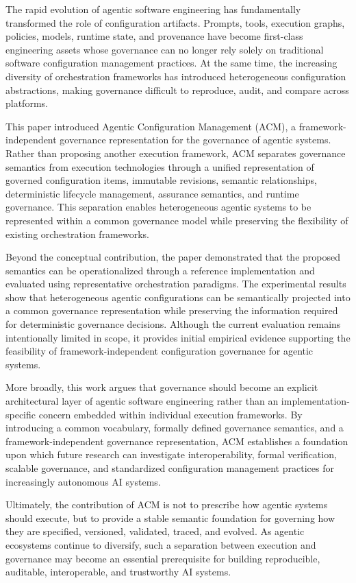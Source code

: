 \documentclass[10pt]{article}
\begin{document}
The rapid evolution of agentic software engineering has fundamentally transformed the role of configuration artifacts. Prompts, tools, execution graphs, policies, models, runtime state, and provenance have become first-class engineering assets whose governance can no longer rely solely on traditional software configuration management practices. At the same time, the increasing diversity of orchestration frameworks has introduced heterogeneous configuration abstractions, making governance difficult to reproduce, audit, and compare across platforms.

This paper introduced Agentic Configuration Management (ACM), a framework-independent governance representation for the governance of agentic systems. Rather than proposing another execution framework, ACM separates governance semantics from execution technologies through a unified representation of governed configuration items, immutable revisions, semantic relationships, deterministic lifecycle management, assurance semantics, and runtime governance. This separation enables heterogeneous agentic systems to be represented within a common governance model while preserving the flexibility of existing orchestration frameworks.

Beyond the conceptual contribution, the paper demonstrated that the proposed semantics can be operationalized through a reference implementation and evaluated using representative orchestration paradigms. The experimental results show that heterogeneous agentic configurations can be semantically projected into a common governance representation while preserving the information required for deterministic governance decisions. Although the current evaluation remains intentionally limited in scope, it provides initial empirical evidence supporting the feasibility of framework-independent configuration governance for agentic systems.

More broadly, this work argues that governance should become an explicit architectural layer of agentic software engineering rather than an implementation-specific concern embedded within individual execution frameworks. By introducing a common vocabulary, formally defined governance semantics, and a framework-independent governance representation, ACM establishes a foundation upon which future research can investigate interoperability, formal verification, scalable governance, and standardized configuration management practices for increasingly autonomous AI systems.

Ultimately, the contribution of ACM is not to prescribe how agentic systems should execute, but to provide a stable semantic foundation for governing how they are specified, versioned, validated, traced, and evolved. As agentic ecosystems continue to diversify, such a separation between execution and governance may become an essential prerequisite for building reproducible, auditable, interoperable, and trustworthy AI systems.




\end{document}
